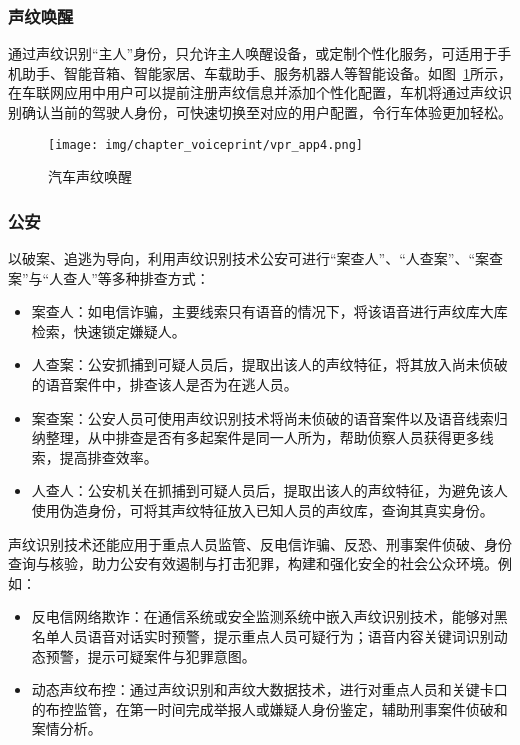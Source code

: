 \documentclass[graybox,envcountchap,sectrefs]{svmono}
\begin{document}
\subsubsection{声纹唤醒}
通过声纹识别“主人”身份，只允许主人唤醒设备，或定制个性化服务，可适用于手机助手、智能音箱、智能家居、车载助手、服务机器人等智能设备。如图~\ref{pic:vprapp4}所示，在车联网应用中用户可以提前注册声纹信息并添加个性化配置，车机将通过声纹识别确认当前的驾驶人身份，可快速切换至对应的用户配置，令行车体验更加轻松。

\begin{figure}[h!]
	\begin{center}
		\texttt{[image: img/chapter\_voiceprint/vpr\_app4.png]}
		\caption{汽车声纹唤醒}
		\label{pic:vprapp4}
	\end{center}
\end{figure}

\subsubsection{公安}
以破案、追逃为导向，利用声纹识别技术公安可进行“案查人”、“人查案”、“案查案”与“人查人”等多种排查方式：
\begin{itemize}
	\item 案查人：如电信诈骗，主要线索只有语音的情况下，将该语音进行声纹库大库检索，快速锁定嫌疑人。
	\item 人查案：公安抓捕到可疑人员后，提取出该人的声纹特征，将其放入尚未侦破的语音案件中，排查该人是否为在逃人员。
	\item 案查案：公安人员可使用声纹识别技术将尚未侦破的语音案件以及语音线索归纳整理，从中排查是否有多起案件是同一人所为，帮助侦察人员获得更多线索，提高排查效率。
	\item 人查人：公安机关在抓捕到可疑人员后，提取出该人的声纹特征，为避免该人使用伪造身份，可将其声纹特征放入已知人员的声纹库，查询其真实身份。
\end{itemize}

声纹识别技术还能应用于重点人员监管、反电信诈骗、反恐、刑事案件侦破、身份查询与核验，助力公安有效遏制与打击犯罪，构建和强化安全的社会公众环境。例如：
\begin{itemize}
	\item 反电信网络欺诈：在通信系统或安全监测系统中嵌入声纹识别技术，能够对黑名单人员语音对话实时预警，提示重点人员可疑行为；语音内容关键词识别动态预警，提示可疑案件与犯罪意图。
	\item 动态声纹布控：通过声纹识别和声纹大数据技术，进行对重点人员和关键卡口的布控监管，在第一时间完成举报人或嫌疑人身份鉴定，辅助刑事案件侦破和案情分析。
\end{itemize}
\end{document}
